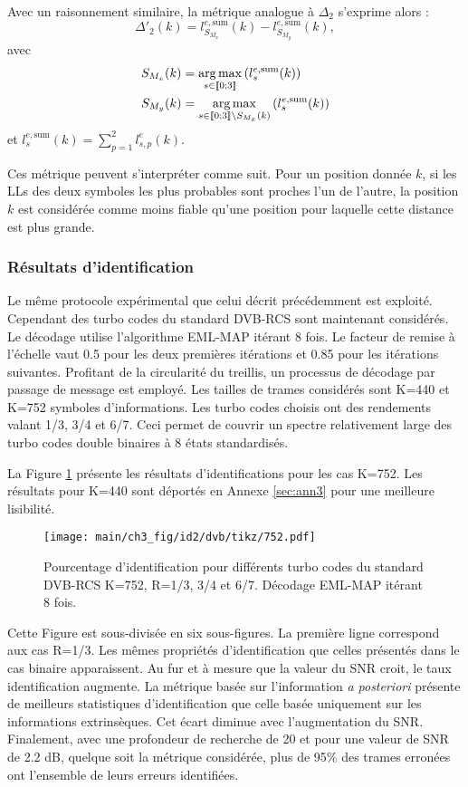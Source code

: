 Avec un raisonnement similaire, la métrique analogue à $\Delta_2$ s'exprime alors : 
\begin{equation}
	\Delta'_2(k) = l^{e,\text{sum}}_{S_{M_x}}(k)-l^{e,\text{sum}}_{S_{M_y}}(k),
\end{equation}
avec
\begin{align*}
S_{M_x}(k) &= \operatorname*{arg\,max}\limits_{s\in\llbracket0;3\rrbracket}\left(l^{e,\text{sum}}_s(k)\right) \\
S_{M_y}(k) &= \operatorname*{arg\,max}\limits_{s\in\llbracket0;3\rrbracket\setminus{S_{M_x}(k)}}\left(l^{e,\text{sum}}_s(k)\right)
\end{align*}
et $l^{e,\text{sum}}_s(k) = \sum\limits_{p=1}^2l^e_{s,p}(k)$.

Ces métrique peuvent s'interpréter comme suit. Pour un position donnée $k$, si les LLs des deux symboles les 
plus probables sont proches l'un de l'autre, la position $k$ est considérée comme moins fiable qu'une position pour
laquelle cette distance est plus grande.

\subsubsection{Résultats d'identification}
Le même protocole expérimental que celui décrit précédemment est exploité. Cependant des turbo codes du standard DVB-RCS
sont maintenant considérés. Le décodage utilise l'algorithme EML-MAP itérant 8 fois. Le facteur de remise à l'échelle 
vaut 0.5 pour les deux premières itérations et 0.85 pour les itérations suivantes. Profitant de la circularité du treillis, 
un processus de décodage par passage de message est employé. Les tailles de trames considérés sont K=440
et K=752 symboles d'informations. Les turbo codes choisis ont des rendements valant 1/3, 3/4 et 6/7. Ceci permet de 
couvrir un spectre relativement large des turbo codes double binaires à 8 états standardisés. 

La Figure \ref{fig:dvb752} présente les résultats d'identifications pour les cas K=752. Les résultats pour K=440 sont 
déportés en Annexe \ref{sec:ann3} pour une meilleure lisibilité.
\begin{figure}[!h]
	\centering
	\hspace*{-1cm}
	\texttt{[image: main/ch3\_fig/id2/dvb/tikz/752.pdf]}
	\vspace*{-1em}
	\caption{Pourcentage d'identification pour différents turbo codes du standard DVB-RCS K=752, R=1/3, 3/4 et 6/7.
	Décodage EML-MAP itérant 8 fois. \label{fig:dvb752}}
\end{figure}
Cette Figure est sous-divisée en six sous-figures. La première ligne correspond aux cas R=1/3. Les mêmes propriétés 
d'identification que celles présentés dans le cas binaire apparaissent. Au fur et à mesure que la valeur du SNR croit, le 
taux identification augmente. La métrique basée sur l'information \textit{a posteriori} présente de meilleurs statistiques
d'identification que celle basée uniquement sur les informations extrinsèques. Cet écart diminue avec l'augmentation du SNR.
Finalement, avec une profondeur de recherche de 20 et pour une valeur de SNR de 2.2 dB, quelque soit la métrique considérée, 
plus de 95\% des trames erronées ont l'ensemble de leurs erreurs identifiées.

